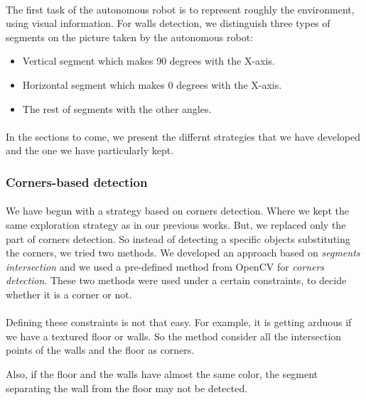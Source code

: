 \documentclass[12pt]{report}
\begin{document}
	 \paragraph{}
	 The first task of the autonomous robot is to represent roughly the environment, using visual information. For walls detection, we distinguish three types of segments on the picture taken by the autonomous robot:
	 \begin{itemize}
	 	\item Vertical segment which makes 90 degrees with the X-axis.
	 	\item Horizontal segment which makes 0 degrees with the  X-axis.
	 	\item The rest of segments with the other angles.
	 \end{itemize} 
	 
	 
	 \paragraph{}
	 In the sections to come, we present the differnt strategies that we have developed and the one we have particularly kept.
	 
	 \subsubsection{Corners-based detection}
	 \paragraph{}
	 We have begun with a strategy based on corners detection. Where we kept the same exploration strategy as in our previous works. But, we replaced only the part of corners detection. So instead of detecting a specific objects substituting the corners, we tried two methods. We developed an approach based on \textit{segments intersection} and we used a pre-defined  method from OpenCV for \textit{corners detection}. These two methods were used under a certain constraints, to decide whether it is a corner or not.
	 \paragraph{}
	 Defining these constraints is not that easy. For example, it is getting arduous if we have a textured floor or walls. So the method consider all the intersection points of the walls and the floor as corners. 
	
	 Also, if the floor and the walls have almost the same color, the segment separating the wall from the floor may not be detected.
	 
\end{document}
